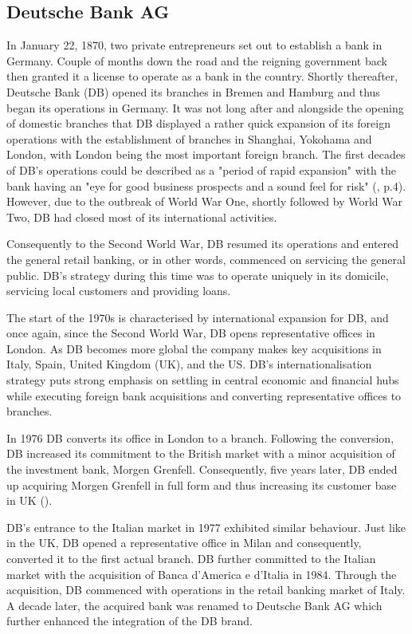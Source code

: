 \documentclass[11pt,a4paper]{article}
\begin{document}
{{\subsection{Deutsche Bank AG}
In January 22, 1870, two private entrepreneurs set out to establish a bank in Germany. Couple of months down the road and the reigning government back then granted it a license to operate as a bank in the country. Shortly thereafter, Deutsche Bank (DB) opened its branches in Bremen and Hamburg and thus began its operations in Germany. It was not long after and alongside the opening of domestic branches that DB displayed a rather quick expansion of its foreign operations with the establishment of branches in Shanghai, Yokohama and London, with London being the most important foreign branch. The first decades of DB's operations could be described as a "period of rapid expansion" with the bank having an "eye for good business prospects and a sound feel for risk" (\cite{deutschebankagDeutscheBank1870}, p.4). However, due to the outbreak of World War One, shortly followed by World War Two, DB had closed most of its international activities. \par
Consequently to the Second World War, DB resumed its operations and entered the general retail banking, or in other words, commenced on servicing the general public. DB's strategy during this time was to operate uniquely in its domicile, servicing local customers and providing loans.  \par
The start of the 1970s  is characterised by international expansion for DB, and once again, since the Second World War, DB opens representative offices in London. As DB becomes more global the company makes key acquisitions in Italy, Spain, United Kingdom (UK), and the US. DB's internationalisation strategy puts strong emphasis on settling in central economic and financial hubs while executing foreign bank acquisitions and converting representative offices to branches. \par
In 1976 DB converts its office in London to a branch. Following the conversion, DB increased its commitment to the British market with a minor acquisition of the investment bank, Morgen Grenfell. Consequently, five years later, DB ended up acquiring Morgen Grenfell in full form and thus increasing its customer base in UK (\cite{deutschebankagDeutscheBankUnited}). \par %
DB's entrance to the Italian market in 1977 exhibited similar behaviour. Just like in the UK, DB opened a representative office in Milan and consequently, converted it to the first actual branch. DB further committed to the Italian market with the acquisition of Banca d'America e d'Italia in 1984. Through the acquisition, DB commenced with operations in the retail banking market of Italy. A decade later, the acquired bank was renamed to Deutsche Bank AG which further enhanced the integration of the DB brand. %
}}
\end{document}
